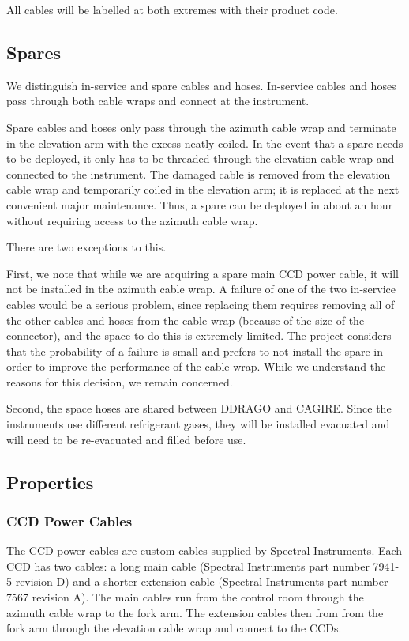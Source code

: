 \documentclass{article}
\begin{document}
All cables will be labelled at both extremes with their product code.

\subsection{Spares}

We distinguish in-service and spare cables and hoses. In-service cables and hoses pass through both cable wraps and connect at the instrument. 

Spare cables and hoses only pass through the azimuth cable wrap and terminate in the elevation arm with the excess neatly coiled. In the event that a spare needs to be deployed, it only has to be threaded through the elevation cable wrap and connected to the instrument. The damaged cable is removed from the elevation cable wrap and temporarily coiled in the elevation arm; it is replaced at the next convenient major maintenance. Thus, a spare can be deployed in about an hour without requiring access to the azimuth cable wrap. 

There are two exceptions to this.

First, we note that while we are acquiring a spare main CCD power cable, it will not be installed in the azimuth cable wrap. A failure of one of the two in-service cables would be a serious problem, since replacing them requires removing all of the other cables and hoses from the cable wrap (because of the size of the connector), and the space to do this is extremely limited. The project considers that the probability of a failure is small and prefers to not install the spare in order to improve the performance of the cable wrap. While we understand the reasons for this decision, we remain concerned.

Second, the space hoses are shared between DDRAGO and CAGIRE. Since the instruments use different refrigerant gases, they will be installed evacuated and will need to be re-evacuated and filled before use.

\subsection{Properties}

\subsubsection{CCD Power Cables}

The CCD power cables are custom cables supplied by Spectral Instruments. Each CCD has two cables: a long main cable (Spectral Instruments part number 7941-5 revision D) and a shorter extension cable (Spectral Instruments part number 7567 revision A). The main cables run from the control room through the azimuth cable wrap to the fork arm. The extension cables then from from the fork arm through the elevation cable wrap and connect to the CCDs.
\end{document}
